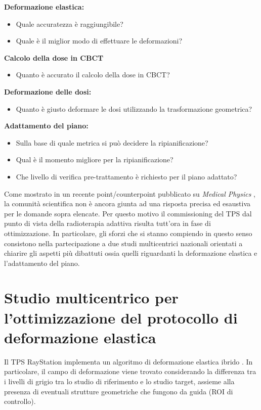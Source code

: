 \noindent\textbf{Deformazione elastica:}
\begin{itemize}
\item Quale accuratezza è raggiungibile?
\item Quale è il miglior modo di effettuare le deformazioni?
\end{itemize}
\textbf{Calcolo della dose in CBCT}
\begin{itemize}
\item Quanto è accurato il calcolo della dose in CBCT?
\end{itemize}
\textbf{Deformazione delle dosi:}
\begin{itemize}
\item Quanto è giusto deformare le dosi utilizzando la trasformazione geometrica?
\end{itemize}
\textbf{Adattamento del piano:}
\begin{itemize}
\item Sulla base di quale metrica si può decidere la ripianificazione?
\item Qual è il momento migliore per la ripianificazione?
\item Che livello di verifica pre-trattamento è richiesto per il piano adattato?
\end{itemize}

Come mostrato in un recente point/counterpoint pubblicato su \textit{Medical Physics} \cite{Schultheiss2012}, la comunità scientifica non è ancora giunta ad una risposta precisa ed esaustiva per le domande sopra elencate. Per questo motivo il commissioning del TPS dal punto di vista della radioterapia adattiva risulta tutt'ora in fase di ottimizzazione. In particolare, gli sforzi che si stanno compiendo in questo senso consistono nella partecipazione a due studi multicentrici nazionali orientati a chiarire gli aspetti più dibattuti ossia quelli riguardanti la deformazione elastica e l'adattamento del piano.

\section{Studio multicentrico per l'ottimizzazione del protocollo di deformazione elastica}
Il TPS RayStation implementa un algoritmo di deformazione elastica ibrido \cite{RaySearchLaboratories2014}. In particolare, il campo di deformazione viene trovato considerando la differenza tra i livelli di grigio tra lo studio di riferimento e lo studio target, assieme alla presenza di eventuali strutture geometriche che fungono da guida (ROI di controllo).


